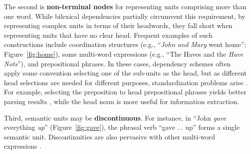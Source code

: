 \documentclass[11pt]{article}
\newcommand{\figref}[1]{Figure~\ref{#1}}
\begin{document}
The second is \textbf{non-terminal nodes} for representing units
comprising more than one word.
While bilexical dependencies partially circumvent this requirement, by
representing complex units in terms of their headwords, they fall short
when representing units that have no clear head.
Frequent examples of such constructions include
coordination structures (e.g., ``\textit{John and Mary} went home''; \figref{fig:home}),
some multi-word expressions (e.g., ``The Haves and the \textit{Have Nots}''),
and prepositional phrases.
In these cases, dependency schemes often apply some convention selecting one of the sub-units
as the head, but as different head selections are needed for different purposes,
standardization problems arise \cite{Ivanova2012who}.
For example, selecting the preposition to head prepositional phrases yields better
parsing results \cite{Schwartz:12}, while the head noun is more useful for
information extraction.

Third, semantic units may be \textbf{discontinuous}. For instance, in
``John \textit{gave} everything \textit{up}''
(\figref{fig:gave}), the phrasal verb ``gave ... up'' forms a single semantic unit.
Discontinuities are also pervasive with other multi-word
expressions \cite{schneider2014discriminative}.
\end{document}
